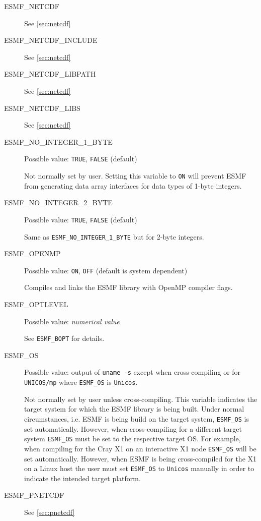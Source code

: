 \begin{description}
\item[ESMF\_NETCDF]
See \ref{sec:netcdf}

\item[ESMF\_NETCDF\_INCLUDE]
See \ref{sec:netcdf}

\item[ESMF\_NETCDF\_LIBPATH]
See \ref{sec:netcdf}

\item[ESMF\_NETCDF\_LIBS]
See \ref{sec:netcdf}

\item[ESMF\_NO\_INTEGER\_1\_BYTE]
Possible value: {\tt TRUE}, {\tt FALSE} (default)

Not normally set by user. Setting this variable to {\tt ON} will prevent ESMF
from generating data array interfaces for data types of 1-byte integers.

\item[ESMF\_NO\_INTEGER\_2\_BYTE] 
Possible value: {\tt TRUE}, {\tt FALSE} (default)

Same as {\tt ESMF\_NO\_INTEGER\_1\_BYTE} but for 2-byte integers.

\item[ESMF\_OPENMP] 
Possible value: {\tt ON}, {\tt OFF} (default is system dependent)

Compiles and links the ESMF library with OpenMP compiler flags.

\item[ESMF\_OPTLEVEL] 
Possible value: {\em numerical value}

See {\tt ESMF\_BOPT} for details.

\item[ESMF\_OS]
Possible value: output of {\tt uname -s} except when cross-compiling or for
{\tt UNICOS/mp} where {\tt ESMF\_OS} is {\tt Unicos}.

Not normally set by user unless cross-compiling. This variable indicates the
target system for which the ESMF library is being built. Under normal
circumstances, i.e. ESMF is being build on the target system, {\tt ESMF\_OS} is
set automatically. However, when cross-compiling for a different target system
{\tt ESMF\_OS} must be set to the respective target OS. For example, when
compiling for the Cray X1 on an interactive X1 node {\tt ESMF\_OS} will be set
automatically. However, when ESMF is being cross-compiled for the X1 on a Linux
host the user must set {\tt ESMF\_OS} to {\tt Unicos} manually in order to
indicate the intended target platform.

\item[ESMF\_PNETCDF]
See \ref{sec:pnetcdf}


\end{description}
